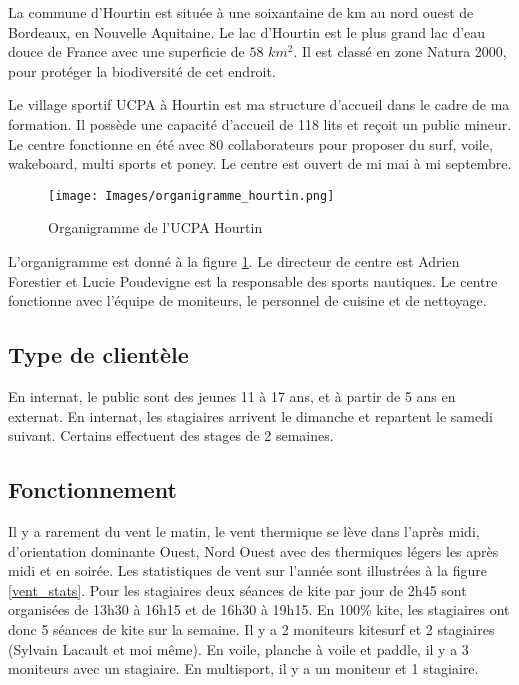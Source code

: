 \documentclass[11pt,a4paper]{report}
\begin{document}
La commune d'Hourtin est située à une soixantaine de km au nord ouest 
de Bordeaux, en Nouvelle Aquitaine. Le lac d'Hourtin est le plus grand
lac d'eau douce de France avec une superficie de $58 \,\,km^2$.
Il est classé en zone Natura 2000\cite{natura2000}, 
pour protéger la biodiversité de cet endroit.

Le village sportif UCPA à Hourtin est ma structure d'accueil dans le cadre de
ma formation. Il possède une capacité d'accueil de 118 lits et reçoit un 
public mineur. Le centre fonctionne en été avec 80 collaborateurs pour
proposer du surf, voile, wakeboard, multi sports et poney.
Le centre est ouvert de mi mai à mi septembre.
 
\begin{figure}[h]
\centering
\texttt{[image: Images/organigramme\_hourtin.png]} 
\caption{Organigramme de l'UCPA Hourtin\label{organi_hourtin}}
\end{figure}
L'organigramme est donné à la figure \ref{organi_hourtin}.
Le directeur de centre est Adrien Forestier et 
Lucie Poudevigne est la responsable des sports nautiques.
Le centre fonctionne avec
l'équipe de moniteurs, le personnel de cuisine et de nettoyage.
\subsection{Type de clientèle}
En internat, le public sont des jeunes 11 à 17 ans, et  à partir de 5 ans  en externat.
En internat, les stagiaires arrivent le dimanche et repartent le samedi suivant.
Certains effectuent des stages de 2 semaines.
\subsection{Fonctionnement}
Il y a rarement du vent le matin, le vent thermique se lève dans l'après midi,
d'orientation dominante Ouest, Nord Ouest avec des thermiques légers les après midi et 
en soirée. Les statistiques de vent sur l'année sont illustrées à la figure \ref{vent_stats}.
Pour les stagiaires deux séances de kite par jour de 2h45 sont organisées de
13h30 à 16h15 et de 16h30 à 19h15. En 100\% kite, les stagiaires ont donc
5 séances de kite sur la semaine.
Il y a 2 moniteurs kitesurf et 2 stagiaires (Sylvain Lacault et moi m\^eme).
En voile, planche à voile et paddle, il y a 3 moniteurs avec un stagiaire.
En multisport, il y a un moniteur et 1 stagiaire.
\end{document}

